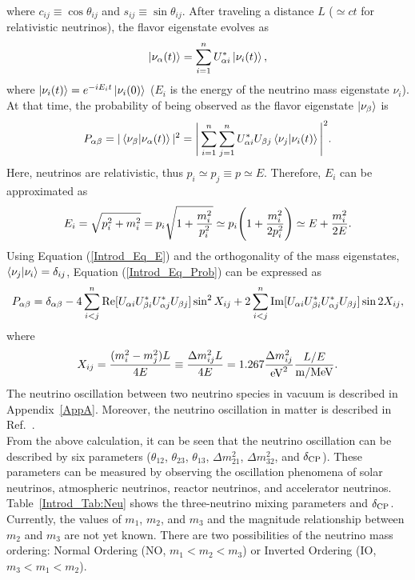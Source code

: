 where $c_{ij}\equiv\cos\theta_{ij}$ and $s_{ij}\equiv\sin\theta_{ij}$.
After traveling a distance $L$ ($\simeq ct$ for relativistic neutrinos), the flavor eigenstate evolves as
\begin{eqnarray}
	\ket{\nu_{\alpha}(t)}=\sum_{i=1}^{n} U_{\alpha i}^{*}\ket{\nu_{i}(t)},
\end{eqnarray}
where $\ket{\nu_{i}(t)}=e^{-iE_{i}t}\ket{\nu_{i}(0)}$ ($E_{i}$ is the energy of the neutrino mass eigenstate $\nu_{i}$).
At that time, the probability of being observed as the flavor eigenstate $\ket{\nu_{\beta}}$ is
\begin{eqnarray}\label{Introd_Eq_Prob}
	P_{\alpha\beta}=|\braket{\nu_{\beta}|\nu_{\alpha}(t)}|^{2}=\Bigg|\sum_{i=1}^{n}\sum_{j=1}^{n} U_{\alpha i}^{*}U_{\beta j}\braket{\nu_{j}|\nu_{i}(t)}\Bigg|^{2}.
\end{eqnarray}
Here, neutrinos are relativistic, thus $p_{i} \simeq p_{j} \equiv p \simeq E$. Therefore, $E_{i}$ can be approximated as
\begin{eqnarray}\label{Introd_Eq_E}
	E_{i} = \sqrt{p_{i}^{2}+m_{i}^{2}} = p_{i}\sqrt{1+{m_{i}^{2} \over p_{i}^{2}}} \simeq p_{i}\Bigg(1+{m_{i}^{2} \over 2p_{i}^{2}}\Bigg) \simeq E+{m_{i}^{2} \over 2E}.
\end{eqnarray}
Using Equation (\ref{Introd_Eq_E}) and the orthogonality of the mass eigenstates, $\braket{\nu_{j}|\nu_{i}}=\delta_{ij}$, Equation (\ref{Introd_Eq_Prob}) can be expressed as
\begin{eqnarray}
	P_{\alpha\beta}=\delta_{\alpha\beta}-4\sum_{i<j}^{n} {\rm Re}[U_{\alpha i}U_{\beta i}^{*}U_{\alpha j}^{*}U_{\beta j}]\sin^{2}X_{ij}+2\sum_{i<j}^{n} {\rm Im}[U_{\alpha i}U_{\beta i}^{*}U_{\alpha j}^{*}U_{\beta j}]\sin 2X_{ij},
\end{eqnarray}
where
\begin{eqnarray}
	X_{ij} = {(m_{i}^{2}-m_{j}^{2})L \over 4E} \equiv {\Delta m_{ij}^{2}L \over 4E} = 1.267{\Delta m_{ij}^{2} \over {\rm eV}^{2}}{L/E \over {\rm m}/{\rm MeV}}.
\end{eqnarray}
The neutrino oscillation between two neutrino species in vacuum is described in Appendix~\ref{AppA}.
Moreover, the neutrino oscillation in matter is described in Ref.~\cite{1989Kuo}.\\
\hs From the above calculation, it can be seen that the neutrino oscillation can be described by six parameters ($\theta_{12}$, $\theta_{23}$, $\theta_{13}$, $\Delta m_{21}^{2}$, $\Delta m_{32}^{2}$, and $\delta_{{\rm CP}}$).
These parameters can be measured by observing the oscillation phenomena of solar neutrinos, atmospheric neutrinos, reactor neutrinos, and accelerator neutrinos.
Table~\ref{Introd_Tab:Neu} shows the three-neutrino mixing parameters and $\delta_{{\rm CP}}$.
Currently, the values of $m_{1}$, $m_{2}$, and $m_{3}$ and the magnitude relationship between $m_{2}$ and $m_{3}$ are not yet known.
There are two possibilities of the neutrino mass ordering: Normal Ordering (NO, $m_{1}<m_{2}<m_{3}$) or Inverted Ordering (IO, $m_{3}<m_{1}<m_{2}$).

